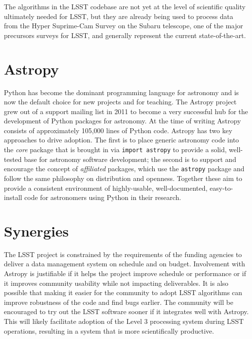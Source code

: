 \documentclass[]{spie}  %
\begin{document}
The algorithms in the LSST codebase are not yet at the level of scientific quality ultimately needed for LSST, but they are already being used to process data from the Hyper Suprime-Cam Survey on the Subaru telescope\cite{2012SPIE.8446E..0ZM}, one of the major precursors surveys for LSST, and generally represent the current state-of-the-art.


\section{Astropy}

Python has become the dominant programming language for astronomy\cite{2000ASPC..216...59G,2006ASPC..351..343H,2006ASPC..351..497K,2011ASPC..442..425G,2012SPIE.8451E..02J} and is now the default choice for new projects and for teaching.
The Astropy\cite{2013A&A...558A..33A} project grew out of a support mailing list in 2011 to become a very successful hub for the development of Python packages for astronomy.
At the time of writing Astropy consists of approximately 105,000 lines of Python code.
Astropy has two key approaches to drive adoption.
The first is to place generic astronomy code into the \emph{core} package that is brought in via \texttt{import astropy} to provide a solid, well-tested base for astronomy software development; the second is to support and encourage the concept of \emph{affiliated} packages, which use the \texttt{astropy} package and follow the same philosophy on distribution and openness.
Together these aim to provide a consistent environment of highly-usable, well-documented, easy-to-install code for astronomers using Python in their research.

\section{Synergies}

The LSST project is constrained by the requirements of the funding agencies to deliver a data management system on schedule and on budget.
Involvement with Astropy is justifiable if it helps the project improve schedule or performance or if it improves community usability while not impacting deliverables.
It is also possible that making it easier for the community to adopt LSST algorithms can improve robustness of the code and find bugs earlier.
The community will be encouraged to try out the LSST software sooner if it integrates well with Astropy.
This will likely facilitate adoption of the Level 3 processing system during LSST operations, resulting in a system that is more scientifically productive.
\end{document}
